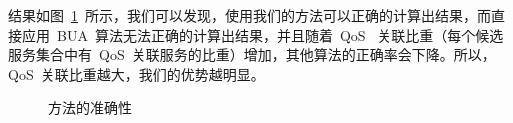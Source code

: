 结果如图~\ref{F:Fig_Exp_Accuracy}~所示，我们可以发现，使用我们的方法可以正确的计算出结果，而直接应用~BUA~算法无法正确的计算出结果，并且随着~QoS~ 关联比重（每个候选服务集合中有~QoS~关联服务的比重）增加，其他算法的正确率会下降。所以，QoS~关联比重越大，我们的优势越明显。

\begin{figure}[!thb]
  \begin{minipage}[b]{1\linewidth} %
    \centering
    \caption{方法的准确性}
    \label{F:Fig_Exp_Accuracy}
  \end{minipage}%
\end{figure}


